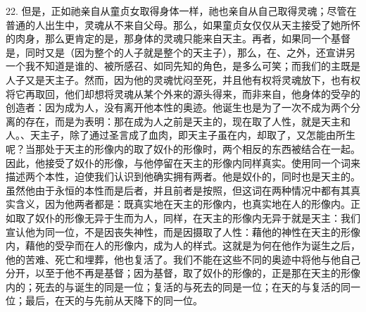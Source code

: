 22. 但是，正如祂亲自从童贞女取得身体一样，祂也亲自从自己取得灵魂；尽管在普通的人出生中，灵魂从不来自父母。那么，如果童贞女仅仅从天主接受了她所怀的肉身，那么更肯定的是，那身体的灵魂只能来自天主。再者，如果同一个基督是，同时又是（因为整个的人子就是整个的天主子），那么，在、之外，还宣讲另一个我不知道是谁的、被所感召、如同先知的角色，是多么可笑；而我们的主既是人子又是天主子。然而，因为他的灵魂忧闷至死，并且他有权将灵魂放下，也有权将它再取回，他们却想将灵魂从某个外来的源头得来，而非来自，他身体的受孕的创造者：因为成为人，没有离开他本性的奥迹。他诞生也是为了一次不成为两个分离的存在，而是为表明：那在成为人之前是天主的，现在取了人性，就是天主和人。、天主子，除了通过圣言成了血肉，即天主子虽在内，却取了，又怎能由所生呢？当那处于天主的形像内的取了奴仆的形像时，两个相反的东西被结合在一起。因此，他接受了奴仆的形像，与他停留在天主的形像内同样真实。使用同一个词来描述两个本性，迫使我们认识到他确实拥有两者。他是奴仆的，同时也是天主的。虽然他由于永恒的本性而是后者，并且前者是按照，但这词在两种情况中都有其真实含义，因为他两者都是：既真实地在天主的形像内，也真实地在人的形像内。正如取了奴仆的形像无异于生而为人，同样，在天主的形像内无异于就是天主：我们宣认他为同一位，不是因丧失神性，而是因摄取了人性：藉他的神性在天主的形像内，藉他的受孕而在人的形像内，成为人的样式。这就是为何在他作为诞生之后，他的苦难、死亡和埋葬，他也复活了。我们不能在这些不同的奥迹中将他与他自己分开，以至于他不再是基督；因为基督，取了奴仆的形像的，正是那在天主的形像内的；死去的与诞生的同是一位；复活的与死去的同是一位；在天的与复活的同一位；最后，在天的与先前从天降下的同一位。\par

